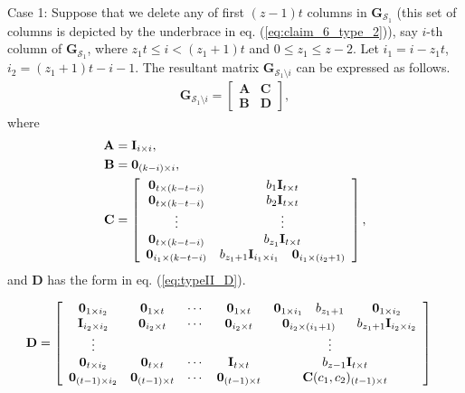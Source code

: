 \documentclass[journal,twocolumn]{IEEEtran}
\theoremstyle{definition}
\newcommand{\calS}{\mathcal{S}}
\newcommand{\bfG}{\mathbf{G}}
\newcommand{\bfI}{\mathbf{I}}
\newcommand{\bfC}{\mathbf{C}}
\newcommand{\bfzr}{\mathbf{0}}
\begin{document}
\begin{itemize}
	Case 1: Suppose that we delete any of first $(z-1)t$ columns in $\bfG_{\calS_1}$ (this set of columns is depicted by the underbrace in eq. (\ref{eq:claim_6_type_2})), say $i$-th column of $\bfG_{\calS_1}$, where $z_1t\le i< (z_1+1)t$ and $0\le z_1\le z-2$. Let $i_1=i-z_1t$, $i_2=(z_1+1)t-i-1$. The resultant matrix $\bfG_{\calS_1 \setminus i}$ can be expressed as follows.
	\begin{align*}
		\bfG_{\calS_1 \setminus i}=
		\left[
		\begin{array}{c|c}
			\mathbf A&\mathbf C\\  \hline
			\mathbf B&\mathbf D
		\end{array}
		\right],
	\end{align*}
	where
	\begin{align*}
		\mathbf A &= \bfI_{i\times i},\\
		\mathbf B &= \bfzr_{(k-i)\times i},\\
		\mathbf C &=
		\left[
		\begin{array}{ccc}
			\bfzr_{t\times (k-t-i)} &\multicolumn{2}{c}{{b_1}\bfI_{t\times t}} \\
			\bfzr_{t\times (k-t-i)} & \multicolumn{2}{c}{{b_2}\bfI_{t\times t}} \\
			\vdots &\multicolumn{2}{c}{\vdots}\\
			\bfzr_{t\times (k-t-i)} & \multicolumn{2}{c}{{b_{z_1}}\bfI_{t\times
					t}}\\
			\bfzr_{i_1\times (k-t-i)} &{b_{z_1+1}\bfI_{i_1\times
				i_1}}&\bfzr_{i_1\times (i_2+1)}
		\end{array}
		\right],
	\end{align*}
	and $\mathbf D$ has the form in eq. (\ref{eq:typeII_D}).
	\begin{table*}[t]
	\begin{align}
\mathbf D &=
\left[
\begin{array}{ccccccc}
\bfzr_{1\times i_2}  & \bfzr_{1\times t} & \cdots & \bfzr_{1\times t} & \bfzr_{1\times i_1} & b_{z_1+1} & \bfzr_{1\times i_2}\\
\bfI_{i_2\times i_2}  &\bfzr_{i_2\times t} &\cdots & \bfzr_{i_2\times t} &\multicolumn{2}{c}{\bfzr_{i_2\times (i_1+1)}} & {b_{z_1+1}}\bfI_{i_2\times
	i_2}\\
\vdots&&&&&\vdots&\\
\bfzr_{t\times i_2}  &\bfzr_{t\times t} &\cdots & \bfI_{t\times t} &\multicolumn{3}{c}{{b_{z-1}}\bfI_{t\times
		t}}\\
\bfzr_{(t-1)\times i_2}&\bfzr_{(t-1)\times t}&\cdots&\bfzr_{(t-1)\times t}&\multicolumn{3}{c}{\bfC(c_1, c_2)_{(t-1)\times t}}
\end{array}
\right]
\label{eq:typeII_D}
\end{align}
	\end{table*}



\end{itemize}
\end{document}
